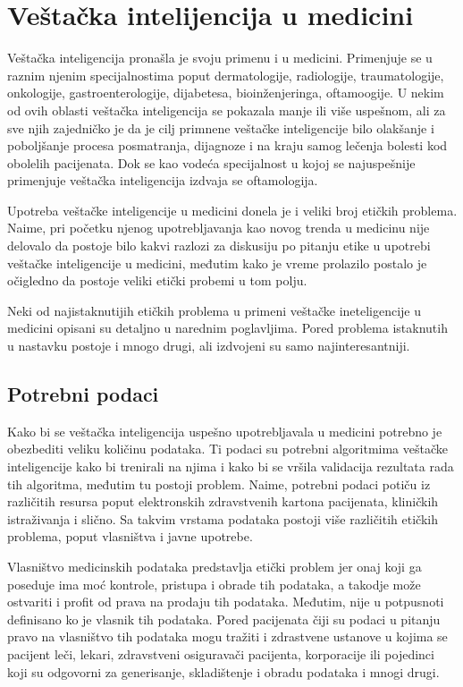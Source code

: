 \documentclass[a4paper]{article}
\begin{document}


\section{Veštačka intelijencija u medicini}
\label{sec:upotreba_veštačke_intelijencije_u_medicini}

Veštačka inteligencija pronašla je svoju primenu i u medicini. Primenjuje se u raznim njenim specijalnostima poput dermatologije, radiologije, traumatologije, onkologije, gastroenterologije, dijabetesa, bioinženjeringa, oftamoogije. U nekim od ovih oblasti veštačka inteligencija se pokazala manje ili više uspešnom, ali za sve njih zajedničko je da je cilj primnene veštačke inteligencije bilo olakšanje i poboljšanje procesa  posmatranja, dijagnoze i na kraju samog lečenja bolesti kod obolelih pacijenata. Dok se kao vodeća specijalnost u kojoj se najuspešnije primenjuje veštačka inteligencija izdvaja se oftamologija.

Upotreba veštačke inteligencije u medicini donela je i veliki broj etičkih problema. Naime, pri početku njenog upotrebljavanja  kao novog trenda u medicinu nije delovalo da postoje bilo kakvi razlozi za diskusiju po pitanju etike u upotrebi veštačke inteligencije u medicini, međutim kako je vreme prolazilo postalo je očigledno da postoje veliki etički probemi u tom polju.

Neki od najistaknutijih etičkih problema u primeni veštačke ineteligencije u medicini opisani su detaljno u narednim poglavljima. Pored problema istaknutih u nastavku postoje i mnogo drugi, ali izdvojeni su samo najinteresantniji.

\subsection{Potrebni podaci}
\label{subsec:poreklo_podataka}

Kako bi se veštačka inteligencija uspešno upotrebljavala u medicini potrebno je obezbediti veliku količinu podataka. Ti podaci su potrebni algoritmima veštačke inteligencije kako bi trenirali na njima i kako bi se vršila validacija rezultata rada tih algoritma, međutim tu postoji problem. Naime, potrebni podaci potiču iz različitih resursa poput elektronskih zdravstvenih kartona pacijenata, kliničkih istraživanja i slično. Sa takvim vrstama podataka postoji više različitih etičkih problema, poput vlasništva i javne upotrebe.

Vlasništvo medicinskih podataka predstavlja etički problem jer onaj koji ga poseduje ima moć kontrole, pristupa i obrade tih podataka, a takodje može ostvariti i profit od prava na prodaju tih podataka. Međutim, nije u potpusnoti definisano ko je vlasnik tih podataka. Pored pacijenata čiji su podaci u pitanju pravo na vlasništvo tih podataka mogu tražiti i zdrastvene ustanove u kojima se pacijent leči, lekari, zdravstveni osiguravači pacijenta, korporacije ili pojedinci koji su odgovorni za generisanje, skladištenje i obradu podataka i mnogi drugi.
\end{document}
